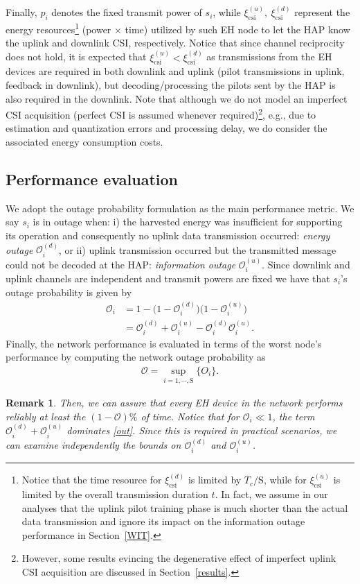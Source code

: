 \documentclass[10pt,journal,a4paper]{IEEEtran}
\newtheorem{remark}{Remark}
\begin{document}
	Finally, $p_i$ denotes the fixed transmit power of $s_i$, while $\xi_\mathrm{csi}^{(u)},\ \xi_\mathrm{csi}^{(d)}$ represent the energy resources\footnote{Notice that the time resource for $\xi_\mathrm{csi}^{(d)}$ is limited by $T_c/\mathrm{S}$, while for $\xi_\mathrm{csi}^{(u)}$ is limited by the overall transmission duration $t$. In fact,  we assume in our analyses that the uplink pilot training phase is much shorter than the actual data transmission and ignore its impact on the information outage performance in Section~\ref{WIT}.} (power $\times$ time) utilized by such EH node to let the HAP know the uplink and downlink CSI, respectively. 
    Notice that since channel reciprocity does not hold, it is expected that $\xi_\mathrm{csi}^{(u)}<\xi_\mathrm{csi}^{(d)}$ as transmissions from the EH devices are required in both downlink and uplink (pilot transmissions in uplink, feedback in downlink), but decoding/processing the pilots sent by the HAP is also required in the downlink. Note that although we do not model an imperfect CSI acquisition (perfect CSI is assumed whenever required)\footnote{However, some results evincing the degenerative effect of imperfect uplink CSI acquisition are discussed in Section~\ref{results}.}, e.g., due to estimation and quantization errors and processing delay, we do consider the associated  energy consumption costs. 
	\subsection{Performance evaluation}\label{performance}
	We adopt the outage probability formulation as the main performance metric. We say $s_i$ is in outage when: i) the harvested energy was insufficient for supporting its operation and consequently no uplink data transmission occurred: \textit{energy outage} $\mathcal{O}_i^{(d)}$, or ii) uplink transmission occurred but the transmitted message could not be decoded at the HAP: \textit{information outage} $\mathcal{O}_i^{(u)}$. Since downlink and uplink channels are independent and transmit powers are fixed we have that $s_i$'s outage probability is given by 
	\begin{align}
	\mathcal{O}_i&=1-\big(1-\mathcal{O}_i^{(d)}\big)\big(1-\mathcal{O}_i^{(u)}\big)\nonumber\\
	&=\mathcal{O}_i^{(d)}+\mathcal{O}_i^{(u)}-\mathcal{O}_i^{(d)}\mathcal{O}_i^{(u)}.\label{out}
	\end{align}
	Finally, the network performance is evaluated in terms of the worst node's performance by computing the network outage probability as
	\begin{align}
	\mathcal{O}=\sup_{i=1,\cdots,\mathrm{S}}\{O_i\}.
	\end{align}
	\begin{remark}
		Then, we can assure that every EH device in the network performs reliably at least the $(1-\mathcal{O})\%$ of time. Notice that for $\mathcal{O}_i\ll 1$, the term $\mathcal{O}_i^{(d)}+\mathcal{O}_i^{(u)}$  dominates \eqref{out}. Since this is required in practical scenarios, we can examine independently the bounds on $\mathcal{O}_i^{(d)}$ and $\mathcal{O}_i^{(u)}$.
	\end{remark}	
\end{document}
